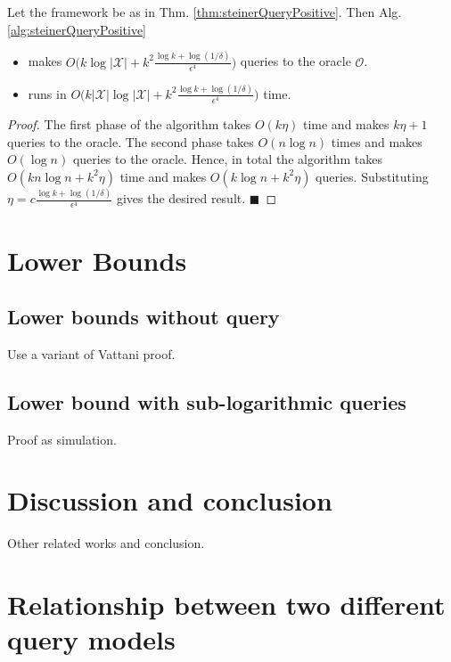 \documentclass[orivec]{llncs}
\newcommand{\mc}{\mathcal}
\renewcommand{\qed}{\hfill\ensuremath{\blacksquare}}
\begin{document}
\begin{theorem}
\label{thm:steinerQueryPositiveComplexity}
Let the framework be as in Thm. \ref{thm:steinerQueryPositive}. Then Alg. \ref{alg:steinerQueryPositive} 
\begin{itemize}[nolistsep,noitemsep]
\item makes $O\big(k\log |\mc X| + k^2\frac{\log k + \log (1/\delta)}{\epsilon^4}\big)$ queries to the oracle $\mc O$.
\item runs in $O\big(k|\mc X|\log |\mc X| + k^2\frac{\log k + \log (1/\delta)}{\epsilon^4}\big)$ time.
\end{itemize}
\end{theorem}

\begin{proof}
The first phase of the algorithm takes $O(k\eta)$ time and makes $k\eta+1$ queries to the oracle. The second phase takes $O(n\log n)$ times and makes $O(\log n)$ queries to the oracle. Hence, in total the algorithm takes $O(kn\log n + k^2\eta)$ time and makes $O(k\log n + k^2\eta)$ queries. Substituting $\eta = c\frac{\log k + \log(1/\delta)}{\epsilon^4}$ gives the desired result.
\qed
\end{proof}

\section{Lower Bounds}
\label{section:lowerBounds}
\subsection{Lower bounds without query}
Use a variant of Vattani proof.
\subsection{Lower bound with sub-logarithmic queries}
Proof as simulation.


\section{Discussion and conclusion}
Other related works and conclusion.




\appendix
\section{Relationship between two different query models}
\label{appendix:diffQueryModels}
\end{document}
